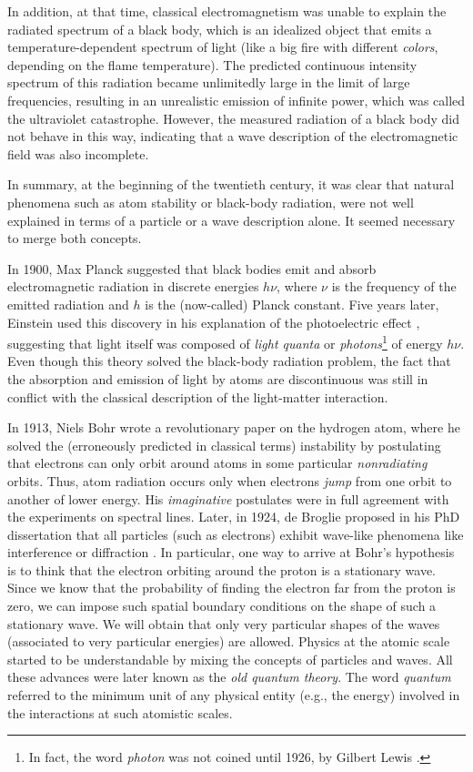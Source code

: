 \documentclass[nofootinbib, secnumarabic, amsmath, nobibnotes,10pt,aps,pra]{revtex4-1}
\begin{document}
In addition, at that time, classical electromagnetism was unable to
explain the radiated spectrum of a black body, which is an idealized
object that emits a temperature-dependent spectrum of light (like a
big fire with different \textit{colors}, depending on
the flame temperature). The predicted continuous intensity spectrum
of this radiation became unlimitedly large in the limit of large frequencies,
resulting in an unrealistic emission of infinite power, which was
called the ultraviolet catastrophe. However, the measured radiation
of a black body did not behave in this way, indicating that a wave
description of the electromagnetic field was also incomplete.

In summary, at the beginning of the twentieth century, it was clear that natural phenomena such as atom stability or black-body radiation, were not well explained in terms of a particle or a wave description alone. It seemed necessary to merge both concepts.

In 1900, Max Planck suggested \cite{om.Planck-BlackBody} that black
bodies emit and absorb electromagnetic radiation in discrete
energies $h\nu$, where $\nu$ is the frequency of the emitted
radiation and $h$ is the (now-called) Planck constant. Five years
later, Einstein used this discovery in his explanation of the
photoelectric effect \cite{om.Einstein-Photoelectric}, suggesting
that light itself was composed of \textit{light quanta} or
\textit{photons}\footnote{In fact, the word \textit{photon} was not
coined until 1926, by Gilbert Lewis \cite{om.gilbert1926}.} of
energy $h\nu$. Even though this theory solved the black-body
radiation problem, the fact that the absorption and emission of
light by atoms are discontinuous was still in conflict with the
classical description of the light-matter interaction.

In 1913, Niels Bohr \cite{om.bohr,om.bohr2,om.bohr3} wrote a
revolutionary paper on the hydrogen atom, where he solved the
(erroneously predicted in classical terms) instability by
postulating that electrons can only orbit around atoms in some
particular \textit{nonradiating} orbits. Thus, atom radiation occurs only when electrons \textit{jump} from one orbit to another of lower
energy. His \textit{imaginative} postulates were in full agreement
with the experiments on spectral lines. Later, in 1924, de Broglie
proposed in his PhD dissertation that all particles (such as
electrons) exhibit wave-like phenomena like interference or
diffraction \cite{om.debroglie1923}. In particular, one way to
arrive at Bohr's hypothesis is to think that the electron orbiting
around the proton is a stationary wave. Since we know that the probability of finding the electron far from the proton is zero, we can impose such spatial boundary conditions on the shape of such a stationary wave. We will obtain that only very particular shapes of the waves (associated to very particular energies) are allowed. Physics at the
atomic scale started to be understandable by mixing the concepts of
particles and waves. All these advances were later known as the
\textit{old quantum theory}. The word \textit{quantum} referred to
the minimum unit of any physical entity (e.g., the energy) involved
in the interactions at such atomistic scales.
\end{document}
